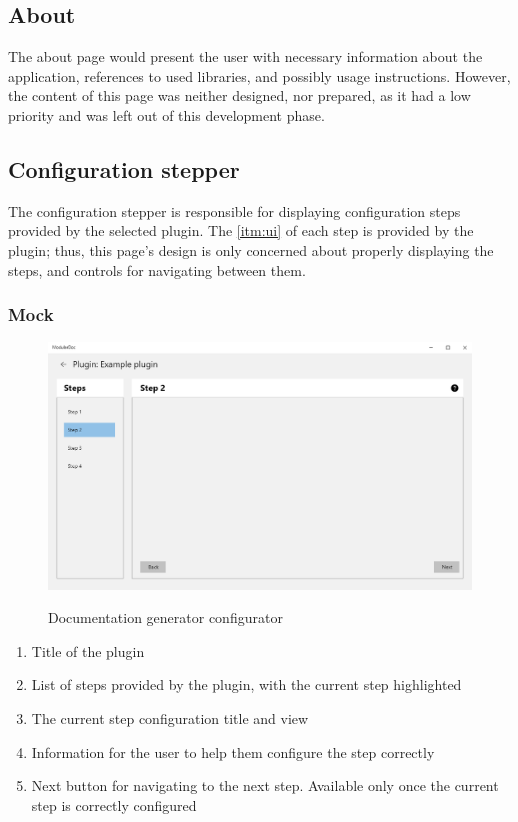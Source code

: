 \subsection{About}

The about page would present the user with necessary information about the application, references to used libraries, and possibly usage instructions. However, the content of this page was neither designed, nor prepared, as it had a low priority and was left out of this development phase.

\subsection{Configuration stepper}

The configuration stepper is responsible for displaying configuration steps provided by the selected plugin. The \ref{itm:ui} of each step is provided by the plugin; thus, this page's design is only concerned about properly displaying the steps, and controls for navigating between them.

\subsubsection{Mock}

\begin{figure}[H]
    \includegraphics[width=\linewidth]{img/mockConfigurator.png}
    \label{fig:configuratorPage}
    \caption{Documentation generator configurator}
\end{figure}

\begin{enumerate}
    \item Title of the plugin
    \item List of steps provided by the plugin, with the current step highlighted
    \item The current step configuration title and view
    \item Information for the user to help them configure the step correctly
    \item Next button for navigating to the next step. Available only once the current step is correctly configured
\end{enumerate}


